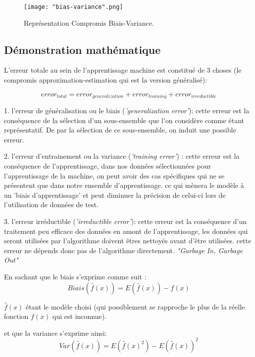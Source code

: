 \documentclass[a4paper]{article}
\begin{document}
\begin{figure}[!h]
	\centering
	\texttt{[image: "bias-variance".png]}
	\caption{Représentation Compromis Biais-Variance. \cite{ReconcilingModernML}}
	\label{Bias-Variance}
\end{figure}

\newpage

\subsection{Démonstration mathématique}

L'erreur totale au sein de l'apprentissage machine est constitué de 3 choses (le compromis approximation-estimation qui est la version généralisé): \newline

\[ error_{total} = error_{generalization} + error_{training} + error_{irreductible} \]

1. l'erreur de généralisation ou le biais (\textit{'generalization error'}): cette erreur est la conséquence de la sélection d'un sous-ensemble que l'on considère comme étant représentatif. De par la sélection de ce sous-ensemble, on induit une possible erreur.\newline

2. l'erreur d'entrainement ou la variance (\textit{'training error'}) : cette erreur est la conséquence de l'apprentissage, dans nos données sélectionnées pour l'apprentissage de la machine, on peut avoir des cas spécifiques qui ne se présentent que dans notre ensemble d'apprentissage. ce qui mènera le modèle à un 'biais d'apprentissage' et peut diminuer la précision de celui-ci lors de l'utilisation de données de test.\newline

3. l'erreur irréductible (\textit{'irreductible error'}): cette erreur est la conséquence d'un traitement peu efficace des données en amont de l'apprentissage, les données qui seront utilisées par l'algorithme doivent êtres nettoyés avant d'être utilisées. cette erreur ne dépends donc pas de l'algorithme directement. \textit{"Garbage In, Garbage Out"}\newline


En sachant que le biais s'exprime comme suit : 
\[ Biais(\hat{f}(x)) = E(\hat{f}(x)) - f(x)\]

 $\hat{f}(x)$ étant le modèle choisi (qui possiblement se rapproche le plus de la réelle fonction $f(x)$ qui est inconnue).
 
 et que la variance s'exprime ainsi: 
 \[ Var(\hat{f}(x)) = E(\hat{f}(x)^2) - E(\hat{f}(x))^2 \]
 
\end{document}
